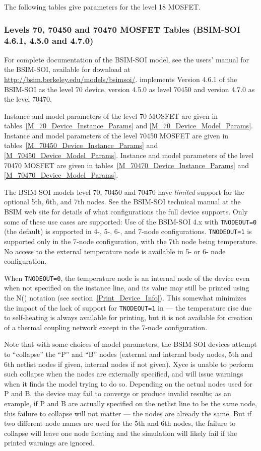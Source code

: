 The following tables give parameters for the level 18 MOSFET.




\clearpage
\subsubsection{Levels 70, 70450 and 70470 MOSFET Tables (BSIM-SOI 4.6.1, 4.5.0 and 4.7.0)}
For complete documentation of the BSIM-SOI model, see the users'
manual for the BSIM-SOI, available for download at
\url{http://bsim.berkeley.edu/models/bsimsoi/}.  \Xyce{} implements
Version 4.6.1 of the BSIM-SOI as the level 70 device, version 4.5.0
as level 70450 and version 4.7.0 as the level 70470.

Instance and model parameters of the level 70 MOSFET are given in
tables~\ref{M_70_Device_Instance_Params} and
\ref{M_70_Device_Model_Params}.
Instance and model parameters of the level 70450 MOSFET are given in
tables~\ref{M_70450_Device_Instance_Params} and
\ref{M_70450_Device_Model_Params}.
Instance and model parameters of the level 70470 MOSFET are given in
tables~\ref{M_70470_Device_Instance_Params} and
\ref{M_70470_Device_Model_Params}.

The \Xyce{} BSIM-SOI models level 70, 70450 and 70470
have {\em limited} support for the optional 5th, 6th, and 7th nodes.
See the BSIM-SOI technical manual at the BSIM web site for details of
what configurations the full device supports.  Only some of these use
cases are supported: Use of the BSIM-SOI 4.x with \texttt{TNODEOUT=0}
(the default) is supported in 4-, 5-, 6-, and 7-node configurations.
\texttt{TNODEOUT=1} is supported only in the 7-node configuration,
with the 7th node being temperature.  No access to the external
temperature node is available in 5- or 6- node configuration.

When \texttt{TNODEOUT=0}, the temperature node is an internal node of
the device even when not specified on the instance line, and its value
may still be printed using the N() notation (see
section~\ref{Print_Device_Info}).  This somewhat minimizes the impact
of the lack of support for \texttt{TNODEOUT=1} in \Xyce{} --- the
temperature rise due to self-heating is always available for printing,
but it is not available for creation of a thermal coupling network
except in the 7-node configuration.

Note that with some choices of model parameters, the BSIM-SOI devices
attempt to ``collapse'' the ``P'' and ``B'' nodes (external and
internal body nodes, 5th and 6th netlist nodes if given, internal
nodes if not given).  Xyce is unable to perform such collapse when the
nodes are externally specified, and will issue warnings when it finds
the model trying to do so.  Depending on the actual nodes used for P
and B, the device may fail to converge or produce invalid results; as
an example, if P and B are actually specified on the netlist line to
be the same node, this failure to collapse will not matter --- the
nodes are already the same.  But if two different node names are used
for the 5th and 6th nodes, the failure to collapse will leave one node
floating and the simulation will likely fail if the printed warnings
are ignored.

